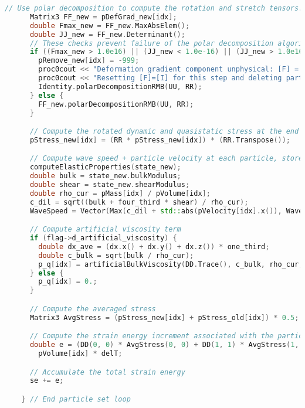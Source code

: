 \begin{enumerate}
\begin{lstlisting}[language=Cpp]
      // Use polar decomposition to compute the rotation and stretch tensors.
      Matrix3 FF_new = pDefGrad_new[idx];
      double Fmax_new = FF_new.MaxAbsElem();
      double JJ_new = FF_new.Determinant();
      // These checks prevent failure of the polar decomposition algorithm if [F_new] has some extreme values.
      if ((Fmax_new > 1.0e16) || (JJ_new < 1.0e-16) || (JJ_new > 1.0e16)) {
        pRemove_new[idx] = -999;
        proc0cout << "Deformation gradient component unphysical: [F] = " << FF << std::endl;
        proc0cout << "Resetting [F]=[I] for this step and deleting particle" << " idx = " << idx << " particleID = " << pParticleID[idx] << std::endl;
        Identity.polarDecompositionRMB(UU, RR);
      } else {
        FF_new.polarDecompositionRMB(UU, RR);
      }

      // Compute the rotated dynamic and quasistatic stress at the end of the current timestep
      pStress_new[idx] = (RR * pStress_new[idx]) * (RR.Transpose());

      // Compute wave speed + particle velocity at each particle, store the  maximum
      computeElasticProperties(state_new);
      double bulk = state_new.bulkModulus;
      double shear = state_new.shearModulus;
      double rho_cur = pMass[idx] / pVolume[idx];
      c_dil = sqrt((bulk + four_third * shear) / rho_cur);
      WaveSpeed = Vector(Max(c_dil + std::abs(pVelocity[idx].x()), WaveSpeed.x()), Max(c_dil + std::abs(pVelocity[idx].y()), WaveSpeed.y()), Max(c_dil + std::abs(pVelocity[idx].z()), WaveSpeed.z()));

      // Compute artificial viscosity term
      if (flag->d_artificial_viscosity) {
        double dx_ave = (dx.x() + dx.y() + dx.z()) * one_third;
        double c_bulk = sqrt(bulk / rho_cur);
        p_q[idx] = artificialBulkViscosity(DD.Trace(), c_bulk, rho_cur, dx_ave);
      } else {
        p_q[idx] = 0.;
      }

      // Compute the averaged stress
      Matrix3 AvgStress = (pStress_new[idx] + pStress_old[idx]) * 0.5;

      // Compute the strain energy increment associated with the particle
      double e = (DD(0, 0) * AvgStress(0, 0) + DD(1, 1) * AvgStress(1, 1) + DD(2, 2) * AvgStress(2, 2) + 2.0 * (DD(0, 1) * AvgStress(0, 1) + DD(0, 2) * AvgStress(0, 2) + DD(1, 2) * AvgStress(1, 2))) *
        pVolume[idx] * delT;

      // Accumulate the total strain energy
      se += e;

    } // End particle set loop


\end{lstlisting}
\end{enumerate}
